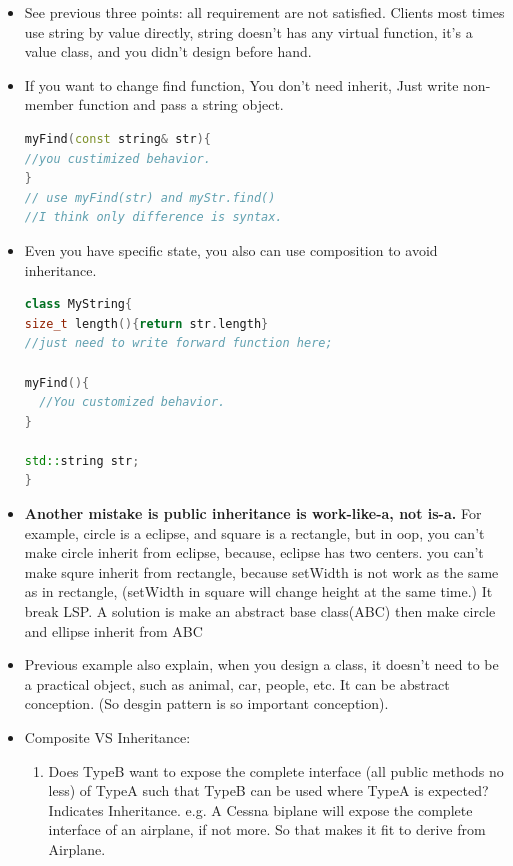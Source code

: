\documentclass[a4paper,12pt,twoside]{book}
\begin{document}
\begin{itemize}
\item See previous three points: all requirement are not satisfied. Clients most times use string by value directly, string doesn't has any virtual function, it's a value class, and you didn't design before hand.

\item If you want to change find function, You don't need inherit,  Just write non-member function and pass a string object.
\begin{lstlisting}[frame=single, language=c++]
myFind(const string& str){
//you custimized behavior.
}
// use myFind(str) and myStr.find()
//I think only difference is syntax.
\end{lstlisting}

\item Even you have specific state, you also can use composition to avoid inheritance.
\begin{lstlisting}[frame=single, language=c++]
class MyString{
size_t length(){return str.length}
//just need to write forward function here;

myFind(){
  //You customized behavior.
}

std::string str;
}
\end{lstlisting}


\item \textbf{Another mistake is public inheritance is work-like-a, not is-a.} For example, circle is a eclipse, and square is a rectangle, but in oop, you can't make circle inherit from eclipse, because, eclipse has two centers.  you can't make squre inherit from rectangle, because setWidth is not work as the same as in rectangle, (setWidth in square will change height at the same time.) It break LSP.  A solution is make an abstract base class(ABC) then make circle and ellipse inherit from ABC


\item Previous example also explain, when you design a class, it doesn't need to be a practical object, such as animal, car, people, etc.  It can be abstract conception.  (So desgin pattern is so important conception).

\item Composite VS Inheritance:
\begin{enumerate}
\item Does TypeB want to expose the complete interface (all public methods no less) of TypeA such that TypeB can be used where TypeA is expected? Indicates Inheritance. e.g. A Cessna biplane will expose the complete interface of an airplane, if not more. So that makes it fit to derive from Airplane.


\end{enumerate}
\end{itemize}
\end{document}
